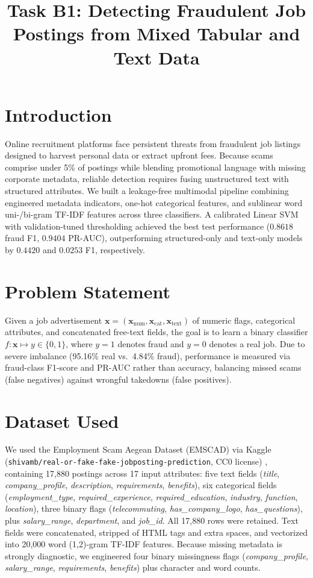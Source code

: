 \documentclass[conference,a4paper]{IEEEtran}
\title{Task B1: Detecting Fraudulent Job Postings from Mixed Tabular and Text Data}
\author{
\IEEEauthorblockN{Aliaan Shams \quad Roll No. 70177202 \quad Section C}
\IEEEauthorblockA{Department of Intelligent Systems, The University of Lahore (AI-101) \\
Repository: \url{https://github.com/Aliaan-70177202/AI101-ML-Assignment-70177202} \\
Instructor: Dr. Muhammad Awais, AI Architect}
}
\begin{document}
\maketitle

\section{Introduction}
Online recruitment platforms face persistent threats from fraudulent job listings designed to harvest personal data or extract upfront fees. Because scams comprise under 5\% of postings while blending promotional language with missing corporate metadata, reliable detection requires fusing unstructured text with structured attributes. We built a leakage-free multimodal pipeline combining engineered metadata indicators, one-hot categorical features, and sublinear word uni-/bi-gram TF-IDF features across three classifiers. A calibrated Linear SVM with validation-tuned thresholding achieved the best test performance ($0.8618$ fraud F1, $0.9404$ PR-AUC), outperforming structured-only and text-only models by $0.4420$ and $0.0253$ F1, respectively.

\section{Problem Statement}
Given a job advertisement $\mathbf{x} = (\mathbf{x}_{\text{num}}, \mathbf{x}_{\text{cat}}, \mathbf{x}_{\text{text}})$ of numeric flags, categorical attributes, and concatenated free-text fields, the goal is to learn a binary classifier $f: \mathbf{x} \mapsto y \in \{0, 1\}$, where $y = 1$ denotes fraud and $y = 0$ denotes a real job. Due to severe imbalance (95.16\% real vs.\ 4.84\% fraud), performance is measured via fraud-class F1-score and PR-AUC rather than accuracy, balancing missed scams (false negatives) against wrongful takedowns (false positives).

\section{Dataset Used}
We used the Employment Scam Aegean Dataset (EMSCAD) via Kaggle (\texttt{shivamb/real-or-fake-fake-jobposting-prediction}, CC0 license) \cite{emscad}, containing 17,880 postings across 17 input attributes: five text fields (\textit{title}, \textit{company\_profile}, \textit{description}, \textit{requirements}, \textit{benefits}), six categorical fields (\textit{employment\_type}, \textit{required\_experience}, \textit{required\_education}, \textit{industry}, \textit{function}, \textit{location}), three binary flags (\textit{telecommuting}, \textit{has\_company\_logo}, \textit{has\_questions}), plus \textit{salary\_range}, \textit{department}, and \textit{job\_id}. All 17,880 rows were retained. Text fields were concatenated, stripped of HTML tags and extra spaces, and vectorized into 20,000 word (1,2)-gram TF-IDF features. Because missing metadata is strongly diagnostic, we engineered four binary missingness flags (\textit{company\_profile}, \textit{salary\_range}, \textit{requirements}, \textit{benefits}) plus character and word counts.
\end{document}
